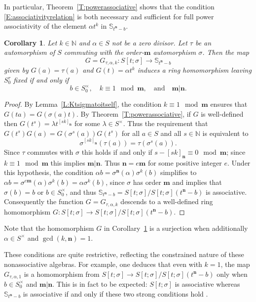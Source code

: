 \documentclass[11pt]{amsart}
\theoremstyle{plain}
\newtheorem{corollary}[theorem]{Corollary}
\theoremstyle{definition}
\numberwithin{equation}{section}
\numberwithin{figure}{section}
\newcommand{\Sone}[1]{\Stsigma/\Stsigma (t^{\de}-#1)} %
\newcommand{\Sonenew}[1]{\mathbb{S}_{t^\de-#1}}
\newcommand{\ring}{S}
\newcommand{\Stsigma}{S[t;\sigma]}
\newcommand{\fixedts}{S_0^\tau}
\newcommand{\os}{\mathbf{m}}  %
\newcommand{\de}{\mathbf{n}}  %
\newcommand{\N}{\mathbb{N}}
\begin{document}
 In particular, Theorem~\ref{T:powerassociative} shows that the condition \eqref{E:associativityrelation} is both necessary and sufficient for full power associativity of the element $\alpha t^k$ in $\Sonenew{b}$.


\begin{corollary}\label{C:StsigmatoSb}
    Let $k\in \N$ and $\alpha \in \ring$ not be a zero divisor. Let $\tau$ be an automorphism of $\ring$ commuting with the order-$\os$ automorphism $\sigma$.  Then the map
    $$
    G =G_{\tau,\alpha,k}: \Stsigma \to \mathbb{S}_{t^\de-b}  %
    $$
    given by $G(a)=\tau(a)$ and $G(t) = \alpha t^k$ induces a ring homomorphism leaving $\fixedts$ fixed %
    if and only if
    $$
    b \in \ring_0^\times, \quad k\equiv 1 \mod \os, \quad \text{and}\quad \os|\de.
    $$
\end{corollary}


\begin{proof}
    By Lemma~\ref{L:Ktsigmatoitself}, the condition $k\equiv 1 \mod \os$ ensures that $G(ta)=G(\sigma(a)t)$.    By Theorem~\ref{T:powerassociative}, if $G$ is well-defined  then $G(t^s)=\lambda t^{[sk]_{\de}}$ for some $\lambda \in \ring^\times$.
    Thus the requirement that
    $G(t^s)G(a)=G(\sigma^s(a))G(t^s)$ for all $a\in \ring$ and all $s\in \mathbb{N}$ is equivalent to
    $$
    \sigma^{[sk]_{\de}}(\tau(a)) = \tau(\sigma^{s}(a)).
    $$
    Since $\tau$ commutes with $\sigma$ this holds if and only if  $s-[sk]_{\de}\equiv 0 \mod \os$; since $k\equiv 1 \mod \os$ this implies $\os|\de$.  Thus $\de= e \os$ for some positive integer $e$.
    Under this hypothesis, the condition $\alpha b = \sigma^{\de}(\alpha)\sigma^k(b)$
     simplifies to  $\alpha b = \sigma^{e\os}(\alpha)\sigma^k(b)=\alpha \sigma^k(b)$,
     since $\sigma$ has order $\os$ and implies that $\sigma(b)=b$ or $b\in \ring_0^\times$, and
    thus $ \mathbb{S}_{t^\de-b} =\Sone{b}$ is associative.
    Consequently
    the function $G=G_{\tau,\alpha,k}$
    descends to a well-defined ring homomorphism $G:\Stsigma\to \Sone{b}$.
\end{proof}

Note that the homomorphism $G$ in Corollary~\ref{C:StsigmatoSb} is a surjection when additionally $\alpha \in \ring^\times$ and $\gcd(k,\de)=1$.

These conditions are quite restrictive, reflecting the constrained nature of these nonassociative algebras. For example, one deduces that even with $k=1$, the map $G_{\tau,\alpha,1}$ is a homomorphism from $\Stsigma\to \Sone{b}$ only when $b\in \ring_0^\times$ and $\os|\de$.  This is in fact to be expected: $\Stsigma$ is associative whereas $ \mathbb{S}_{t^\de-b} $ %
is associative if and only if these two strong conditions hold \cite[(15)]{Petit1967}.
\end{document}
